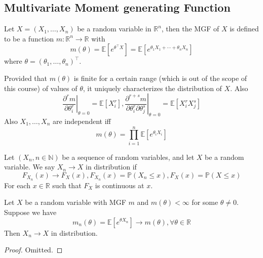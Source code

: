 \subsection{Multivariate Moment generating Function}
\begin{definition}
    Let $X=(X_1,\ldots,X_n)$ be a random variable in $\mathbb R^n$, then the MGF of $X$ is defined to be a function $m:\mathbb R^n\to\mathbb R$ with
    $$m(\theta)=\mathbb E[e^{\theta^\top X}]=\mathbb E[e^{\theta_1X_1+\cdots+\theta_nX_n}]$$
    where $\theta=(\theta_1,\ldots,\theta_n)^\top$.
\end{definition}
Provided that $m(\theta)$ is finite for a certain range (which is out of the scope of this course) of values of $\theta$, it uniquely characterizes the distribution of $X$.
Also
$$\left.\frac{\partial^rm}{\partial\theta_i^r}\right|_{\theta=0}=\mathbb E[X_i^r],\left.\frac{\partial^{r+s}m}{\partial\theta_i^r\partial\theta_j^s}\right|_{\theta=0}=\mathbb E[X_i^rX_j^s]$$
Also $X_1,\ldots,X_n$ are independent iff
$$m(\theta)=\prod_{i=1}^n\mathbb E[e^{\theta_iX_i}]$$
\begin{definition}
    Let $(X_n,n\in\mathbb N)$ be a sequence of random variables, and let $X$ be a random variable.
    We say $X_n\to X$ in distribution if
    $$F_{X_n}(x)\to F_X(x),F_{X_n}(x)=\mathbb P(X_n\le x),F_X(x)=\mathbb P(X\le x)$$
    For each $x\in\mathbb R$ such that $F_X$ is continuous at $x$.
\end{definition}
\begin{theorem}
    Let $X$ be a random variable with MGF $m$ and $m(\theta)<\infty$ for some $\theta\neq 0$.
    Suppose we have
    $$m_n(\theta)=\mathbb E[e^{\theta X_n}]\to m(\theta),\forall\theta\in\mathbb R$$
    Then $X_n\to X$ in distribution.
\end{theorem}
\begin{proof}
    Omitted.
\end{proof}
